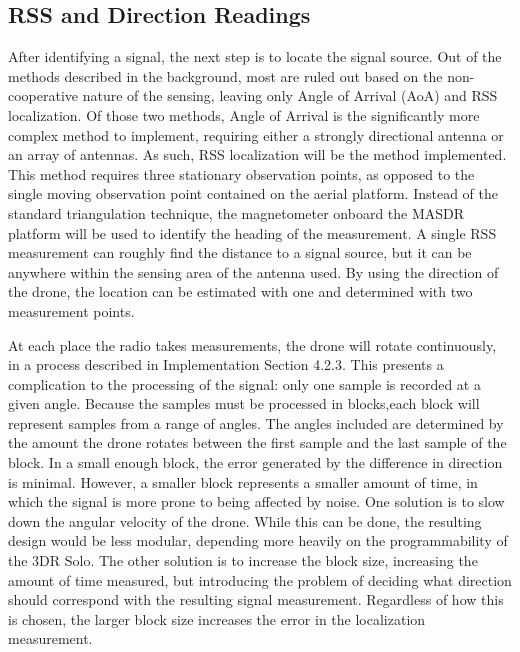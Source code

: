 \subsection{RSS and Direction Readings}
After identifying a signal, the next step is to locate the signal source. Out of the methods described in the background, most are ruled out based on the non-cooperative nature of the sensing, leaving only Angle of Arrival (AoA) and RSS localization. Of those two methods, Angle of Arrival is the significantly more complex method to implement, requiring either a strongly directional antenna or an array of antennas\cite{local_aoa}. As such, RSS localization will be the method implemented. This method requires three stationary observation points, as opposed to the single moving observation point contained on the aerial platform. Instead of the standard triangulation technique, the magnetometer onboard the MASDR platform will be used to identify the heading of the measurement\cite{rss_calc}. A single RSS measurement can roughly find the distance to a signal source, but it can be anywhere within the sensing area of the antenna used. By using the direction of the drone, the location can be estimated with one and determined with two measurement points.\par 
At each place the radio takes measurements, the drone will rotate continuously, in a process described in Implementation Section 4.2.3. This presents a complication to the processing of the signal: only one sample is recorded at a given angle. Because the samples must be processed in blocks,each block will represent samples from a range of angles. The angles included are determined by the amount the drone rotates between the first sample and the last sample of the block. In a small enough block, the error generated by the difference in direction is minimal. However, a smaller block represents a smaller amount of time, in which the signal is more prone to being affected by noise. One solution is to slow down the angular velocity of the drone. While this can be done, the resulting design would be less modular, depending more heavily on the programmability of the 3DR Solo. The other solution is to increase the block size, increasing the amount of time measured, but introducing the problem of deciding what direction should correspond with the resulting signal measurement. Regardless of how this is chosen, the larger block size increases the error in the localization measurement.\par 
